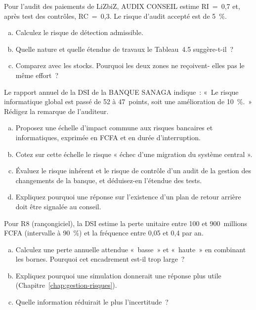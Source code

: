 \begin{boxexo}[title={\ding{45}\quad Exercice~4.7. Inverser le modèle \niveaumoyen}]
Pour l'audit des paiements de LiZbiZ, AUDIX CONSEIL estime RI~=~0,7 et,
après test des contrôles, RC~=~0,3. Le risque d'audit accepté est de
5~\%.
\begin{enumerate}[(a)]
    \item Calculez le risque de détection admissible.
    \item Quelle nature et quelle étendue de travaux le Tableau~4.5
          suggère-t-il~?
    \item Comparez avec les stocks. Pourquoi les deux zones ne reçoivent-
          elles pas le même effort~?
\end{enumerate}
\end{boxexo}

\begin{boxexo}[title={\ding{45}\quad Exercice~4.8. Additionner des scores \niveaumoyen}]
Le rapport annuel de la DSI de la BANQUE SANAGA indique~: «~Le risque
informatique global est passé de 52 à 47~points, soit une amélioration de
10~\%.~» Rédigez la remarque de l'auditeur.
\end{boxexo}

\begin{boxexo}[title={\ding{45}\quad Exercice~4.9. Une échelle commune pour la BANQUE SANAGA \niveauexpert}]
\begin{enumerate}[(a)]
    \item Proposez une échelle d'impact commune aux risques bancaires et
          informatiques, exprimée en FCFA et en durée d'interruption.
    \item Cotez sur cette échelle le risque « échec d'une migration du
          système central ».
    \item Évaluez le risque inhérent et le risque de contrôle d'un audit de
          la gestion des changements de la banque, et déduisez-en l'étendue
          des tests.
    \item Expliquez pourquoi une réponse \NEK{} sur l'existence d'un plan de
          retour arrière doit être signalée au conseil.
\end{enumerate}
\end{boxexo}

\begin{boxexo}[title={\ding{45}\quad Exercice~4.10. Intervalles et perte attendue \niveauexpert}]
Pour R8 (rançongiciel), la DSI estime la perte unitaire entre 100 et
900~millions FCFA (intervalle à 90~\%) et la fréquence entre 0,05 et 0,4
par an.
\begin{enumerate}[(a)]
    \item Calculez une perte annuelle attendue «~basse~» et «~haute~» en
          combinant les bornes. Pourquoi cet encadrement est-il trop
          large~?
    \item Expliquez pourquoi une simulation donnerait une réponse plus
          utile (Chapitre~\ref{chap:gestion-risques}).
    \item Quelle information réduirait le plus l'incertitude~?
\end{enumerate}
\end{boxexo}

